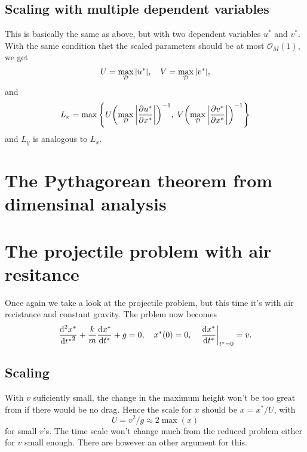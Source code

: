 \documentclass[11pt,letter, swedish, english
]{article}
\begin{document}
\subsection{Scaling with multiple dependent variables}
This is basically the same as above, but with two dependent variables
$u^*$ and $v^*$. With the same condition thet the scaled parameters
should be at most $\mathcal{O}_M(1)$, we get
\begin{equation}
U=\max_\mathcal{D}\abs{u^*} \qcomma
V=\max_\mathcal{D}\abs{v^*},
\end{equation}
and 
\begin{equation}
L_x=\max\qty{
U\qty(\max_\mathcal{D}\abs{\pdv{u^*}{x^*}})^{-1},\;
V\qty(\max_\mathcal{D}\abs{\pdv{v^*}{x^*}})^{-1}
}
\end{equation}
and $L_y$ is analogous to $L_x$.


\renewcommand{\thesubsection}{\arabic{section} (\alph{subsection})}
\renewcommand{\thesubsubsection}{\arabic{section} (\alph{subsection},\,\roman{subsubsection})}

\section{The Pythagorean theorem from dimensinal analysis}




\section{The projectile problem with air resitance}
Once again we take a look at the projectile problem, but this time
it's with air recistance and constant gravity. The prblem now becomes
\begin{equation}\label{eq:4_gov_eqn}
\frac{\dd^2{x^*}}{\dd{t^*}^2} + \frac{k}{m}\frac{\dd{x^*}}{\dd{t^*}} + g = 0
\qcomma x^*(0)=0\qcomma \eval{\dv{x^*}{t^*}}_{t^*=0}=v.
\end{equation}

\subsection{Scaling}
With $v$ suficiently small, the change in the maximum height won't be
too great from if there would be no drag. Hence the scale for $x$
should be $x=x^*/U$, with 
\begin{equation}\label{eq:4_xscale}
U=v^2/g\approx2\max(x)
\end{equation}
for small $v$'s. 
The time scale won't change much from the reduced problem either for
$v$ small enough. There are however an other argument for this. 
\end{document}
